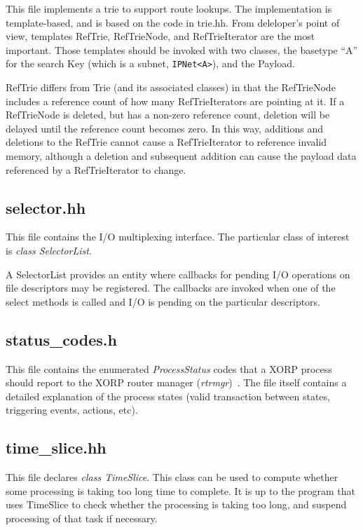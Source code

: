 \documentclass[11pt]{article}
\begin{document}
This file implements a trie to support route lookups.  The
implementation is template-based, and is based on the code in
trie.hh. From deleloper's point of view, templates RefTrie, RefTrieNode, and
RefTrieIterator are the most important. Those templates should be invoked
with two classes, the basetype ``A'' for the search Key (which is a
subnet, \verb=IPNet<A>=), and the Payload.

RefTrie differs from Trie (and its associated classes) in that the
RefTrieNode includes a reference count of how many RefTrieIterators
are pointing at it.  If a RefTrieNode is deleted, but has a non-zero
reference count, deletion will be delayed until the reference count
becomes zero.  In this way, additions and deletions to the RefTrie
cannot cause a RefTrieIterator to reference invalid memory, although a
deletion and subsequent addition can cause the payload data referenced
by a RefTrieIterator to change.


\subsection{selector.hh}

This file contains the I/O multiplexing interface. The particular class
of interest is \emph{class SelectorList}.

A SelectorList provides an entity where callbacks for pending I/O
operations on file descriptors may be registered.  The callbacks
are invoked when one of the select methods is called and I/O
is pending on the particular descriptors.

\subsection{status\_codes.h}

This file contains the enumerated \emph{ProcessStatus} codes
that a XORP process should report to the XORP router manager
(\emph{rtrmgr})~\cite{xorp:rtrmgr}.
The file itself contains a detailed explanation of the process states
(valid transaction between states, triggering events, actions, etc).

\subsection{time\_slice.hh}

This file declares \emph{class TimeSlice}.
This class can be used to compute whether some processing is taking
too long time to complete. It is up to the program that uses
TimeSlice to check whether the processing is taking too long,
and suspend processing of that task if necessary.
\end{document}
